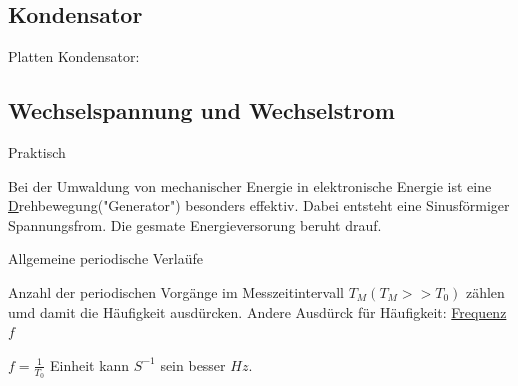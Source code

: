 \documentclass{article}
\begin{document}
\subsection{Kondensator}
Platten Kondensator:


\subsection{Wechselspannung und Wechselstrom}


\begin{figure}[h!]
  \begin{center}
  \end{center}
\end{figure}



Praktisch

Bei der Umwaldung von mechanischer Energie in elektronische Energie ist eine \underline Drehbewegung("Generator") besonders effektiv. Dabei entsteht eine Sinusförmiger Spannungsfrom. Die gesmate Energieversorung beruht drauf.


Allgemeine periodische Verlaüfe 


Anzahl der periodischen Vorgänge im Messzeitintervall $T_M(T_M>>T_0)$ zählen umd damit die Häufigkeit ausdürcken. Andere Ausdürck für Häufigkeit: \underline{Frequenz} $f$ 

$f = \frac{1}{T_0}$ Einheit kann $S^{-1}$ sein besser \underline{$Hz$}.
\end{document}
